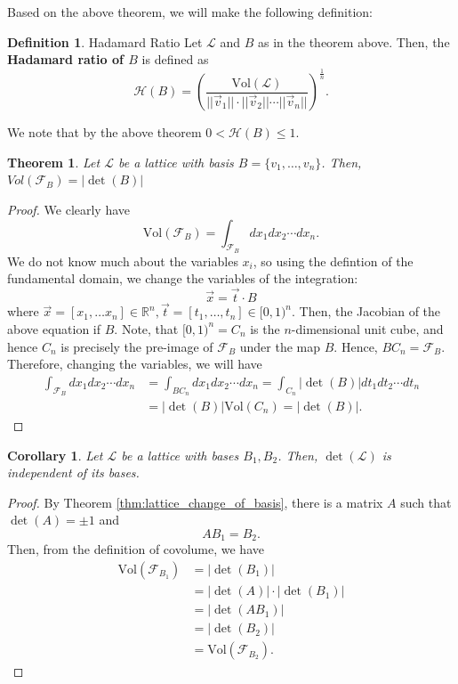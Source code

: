 \documentclass{article}
\newtheorem{theorem}{Theorem}[section]
\newtheorem{corollary}{Corollary}[theorem]
\theoremstyle{definition}
\newtheorem{definition}{Definition}[section]
\theoremstyle{example}
\newcommand{\Vol}{\text{Vol}}
\renewcommand{\L}{\mathcal{L}}
\newcommand{\F}{\mathcal{F}}
\newcommand{\Reals}{\mathbb{R}}
\renewcommand{\H}{\mathcal{H}}
\newcommand{\norm}[1]{||#1||}
\begin{document}
Based on the above theorem, we will make the following definition:
\begin{definition}{Hadamard Ratio}
  Let $\L$ and $B$ as in the theorem above. Then, the \textbf{Hadamard ratio of $B$}
  is defined as
  \[
    \H(B) = \left( \frac{\Vol(\L)}{\norm{\vec{v}_1}\cdot\norm{\vec{v}_2}\cdots\norm{\vec{v}_n}} \right)^{\frac1n}.
  \]
\end{definition}
We note that by the above theorem $0 < \H(B) \leq 1$.
\begin{theorem}
  Let $\L$ be a lattice with basis $B = \{v_1, \hdots, v_n\}$. Then, $Vol(\F_B) = |\det(B)|$
\end{theorem}
\begin{proof}
  We clearly have
  \[
    \Vol(\F_B) = \int_{\F_B} dx_1dx_2\cdots dx_n.
  \]
  We do not know much about the variables $x_i$, so using the defintion of the
  fundamental domain, we change the variables of the integration:
  \[
    \vec{x} = \vec{t} \cdot B
  \]
  where $\vec{x} = [x_1, \hdots x_n] \in \Reals^n, \vec{t} = [t_1, \hdots, t_n] \in
  [0, 1)^n$. Then, the Jacobian of the above equation if $B$.
  Note, that $[0, 1)^n = C_n$ is the $n$-dimensional unit cube, and
  hence $C_n$ is precisely the pre-image of $\F_B$ under the map $B$. Hence, $BC_n = \F_B$.
  Therefore, changing the variables, we will have
  \begin{align*}
    \int_{\F_B} dx_1dx_2\cdots dx_n &= \int_{BC_n} dx_1dx_2\cdots dx_n =
                                      \int_{C_n} |\det(B)|dt_1dt_2\cdots dt_n \\
                                    &= |\det(B)|\Vol(C_n) = |\det(B)|.
  \end{align*}
\end{proof}
\begin{corollary}
  Let $\L$ be a lattice with bases $B_1, B_2$. Then, $\det(\L)$ is independent
  of its bases.
\end{corollary}
\begin{proof}
  By Theorem \ref{thm:lattice_change_of_basis}, there is a matrix $A$ such that
  $\det(A) = \pm 1$ and
  \[
    AB_1 = B_2.
  \]
  Then, from the definition of covolume, we have
  \begin{align*}
    \Vol(\F_{B_1}) &= |\det(B_1)| \\
                  &= |\det(A)| \cdot |\det(B_1)| \\
                  &= |\det(AB_1) | \\
                  &= |\det(B_2)| \\
                  &= \Vol(\F_{B_2}).
  \end{align*}
\end{proof}
\end{document}
